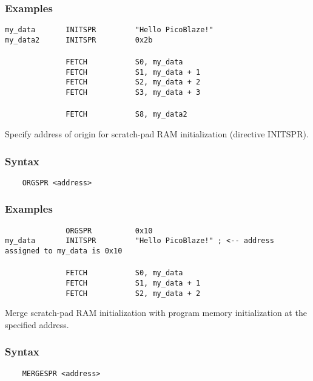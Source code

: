     \subsubsection{Examples}
        \verb'my_data       INITSPR         "Hello PicoBlaze!"'\\
        \verb'my_data2      INITSPR         0x2b'\\
        \verb''\\
        \verb'              FETCH           S0, my_data'\\
        \verb'              FETCH           S1, my_data + 1'\\
        \verb'              FETCH           S2, my_data + 2'\\
        \verb'              FETCH           S3, my_data + 3'\\
        \verb''\\
        \verb'              FETCH           S8, my_data2'

    Specify address of origin for scratch-pad RAM initialization (directive INITSPR).

    \subsubsection{Syntax}
        \verb'    ORGSPR <address>'

    \subsubsection{Examples}
        \verb'              ORGSPR          0x10'\\
        \verb'my_data       INITSPR         "Hello PicoBlaze!" ; <-- address assigned to my_data is 0x10'\\
        \verb''\\
        \verb'              FETCH           S0, my_data'\\
        \verb'              FETCH           S1, my_data + 1'\\
        \verb'              FETCH           S2, my_data + 2'

    Merge scratch-pad RAM initialization with program memory initialization at the specified address.

    \subsubsection{Syntax}
        \verb'    MERGESPR <address>'

